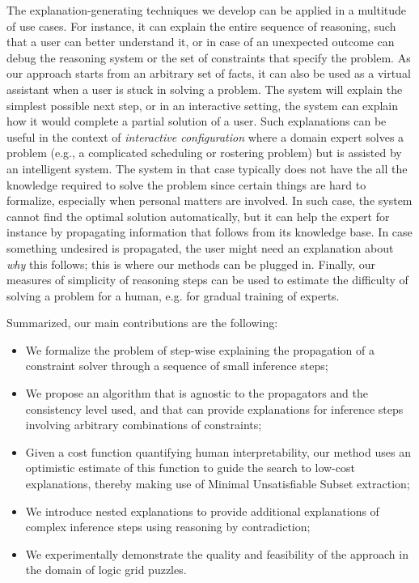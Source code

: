 The explanation-generating techniques we develop can be applied in a multitude of use cases. 
For instance, it can explain the entire sequence of reasoning, such that a user can better understand it, or in case of an unexpected outcome can debug the reasoning system or the set of constraints that specify the problem. 
As our approach starts from an arbitrary set of facts, it can also be used as a virtual assistant when a user is stuck in solving a problem.
The system will explain the simplest possible next step, or in an interactive setting, the system can explain how it would complete a partial solution of a user. Such explanations can be useful in the context of  \emph{interactive configuration} \cite{felfernig2014knowledge} where a domain expert solves a problem (e.g., a complicated scheduling or rostering problem) but is assisted by an intelligent system. 
The system in that case typically does not have the all the knowledge required to solve the problem since certain things are hard to formalize, especially when personal matters are involved. In such case, the system cannot find the optimal solution automatically, but it can help the expert for instance by propagating information that follows from its knowledge base. In case something undesired is propagated, the user might need an explanation about \emph{why} this follows; this is where our methods can be plugged in.
% 
% 
Finally, our measures of simplicity of reasoning steps can be used to estimate the difficulty of solving a problem for a human, e.g. for gradual training of experts.


Summarized, our main contributions are the following:
\begin{itemize}
	\item We formalize the problem of step-wise explaining the propagation of a constraint solver through a sequence of small inference steps;
	\item We propose an algorithm that is agnostic to the propagators and the consistency level used, and that can provide explanations for inference steps involving arbitrary combinations of constraints;
	\item Given a cost function quantifying human interpretability, our method uses an optimistic estimate of this function to guide the search to low-cost explanations, thereby making use of Minimal Unsatisfiable Subset extraction;
	\item We introduce nested explanations to provide additional explanations of complex inference steps using reasoning by contradiction;
	\item We experimentally demonstrate the quality and feasibility of the approach in the domain of logic grid puzzles.
\end{itemize}


